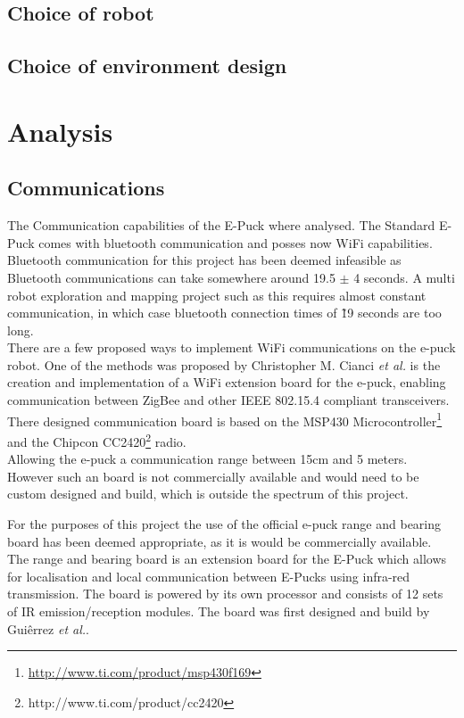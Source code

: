 \subsection{Choice of robot}

\subsection{Choice of environment design}

\section{Analysis}

\subsection{Communications}
The Communication capabilities of the E-Puck where analysed. The Standard E-Puck comes  with bluetooth communication and posses now WiFi capabilities. \\
Bluetooth  communication for this project has been deemed infeasible as Bluetooth communications can take somewhere around 19.5 $\pm$ 4 seconds. A multi robot exploration and mapping project such as this requires almost constant communication, in which case bluetooth connection times of \~19 seconds are too long.\\

There are a few proposed ways to implement WiFi communications on the e-puck robot. 
One of the methods was proposed by Christopher M. Cianci \textit{et al.}\cite{Cianci2007Communication} is the creation and implementation of a WiFi extension board for the e-puck, enabling communication between ZigBee and other IEEE 802.15.4 compliant transceivers. \\
There designed communication board is based on the MSP430 Microcontroller\footnote{\url{http://www.ti.com/product/msp430f169}} and the Chipcon CC2420\footnote{http://www.ti.com/product/cc2420} radio.\\
Allowing the e-puck a communication range between 15cm and 5 meters. \\
However such an board is not commercially available and would need to be custom designed and build, which is outside the spectrum of this project.

For the purposes of this project the use of the official e-puck range and bearing board has been deemed appropriate, as it is would be commercially available.\\
The range and bearing board is an extension board for the E-Puck which allows for localisation and local communication between E-Pucks using infra-red transmission. 
The board is powered by its own processor and consists of 12 sets of IR emission/reception modules. 
The board was first designed and build by Guiêrrez \textit{et al.}\cite{Gutierrez}. 

